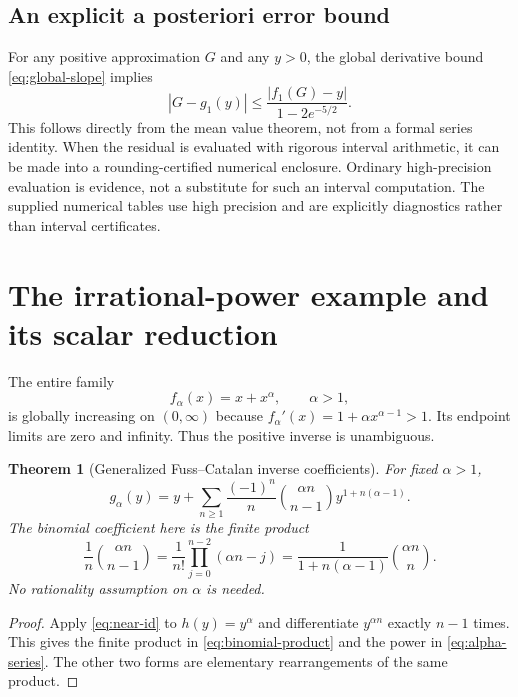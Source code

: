 \documentclass[11pt,a4paper]{article}
\numberwithin{equation}{section}
\newtheorem{theorem}{Theorem}[section]
\theoremstyle{definition}
\theoremstyle{remark}
\newcommand{\abs}[1]{\left|#1\right|}
\begin{document}
\subsection{An explicit a posteriori error bound}

For any positive approximation $G$ and any $y>0$, the global derivative
bound \eqref{eq:global-slope} implies
\begin{equation}
 \abs{G-g_1(y)}\le\frac{\abs{f_1(G)-y}}{1-2e^{-5/2}}.
 \label{eq:global-certificate}
\end{equation}
This follows directly from the mean value theorem, not from a formal
series identity. When the residual is evaluated with rigorous interval
arithmetic, it can be made into a rounding-certified numerical enclosure.
Ordinary high-precision evaluation is evidence, not a substitute for such
an interval computation. The supplied numerical tables use high precision
and are explicitly diagnostics rather than interval certificates.

\section{The irrational-power example and its scalar reduction}
\label{sec:irrational}

The entire family
\begin{equation}
 f_\alpha(x)=x+x^\alpha,\qquad\alpha>1,
 \label{eq:alpha}
\end{equation}
is globally increasing on $(0,\infty)$ because
$f_\alpha'(x)=1+\alpha x^{\alpha-1}>1$. Its endpoint limits are zero and
infinity. Thus the positive inverse is unambiguous.

\begin{theorem}[Generalized Fuss--Catalan inverse coefficients]
For fixed $\alpha>1$,
\begin{equation}
 g_\alpha(y)=y+\sum_{n\ge1}
       \frac{(-1)^n}{n}\binom{\alpha n}{n-1}
       y^{1+n(\alpha-1)}.
 \label{eq:alpha-series}
\end{equation}
The binomial coefficient here is the finite product
\begin{equation}
 \frac1n\binom{\alpha n}{n-1}
 =\frac1{n!}\prod_{j=0}^{n-2}(\alpha n-j)
 =\frac1{1+n(\alpha-1)}\binom{\alpha n}{n}.
 \label{eq:binomial-product}
\end{equation}
No rationality assumption on $\alpha$ is needed.
\end{theorem}
\begin{proof}
Apply \eqref{eq:near-id} to $h(y)=y^\alpha$ and differentiate
$y^{\alpha n}$ exactly $n-1$ times. This gives the finite product in
\eqref{eq:binomial-product} and the power in \eqref{eq:alpha-series}.
The other two forms are elementary rearrangements of the same product.
\end{proof}
\end{document}
